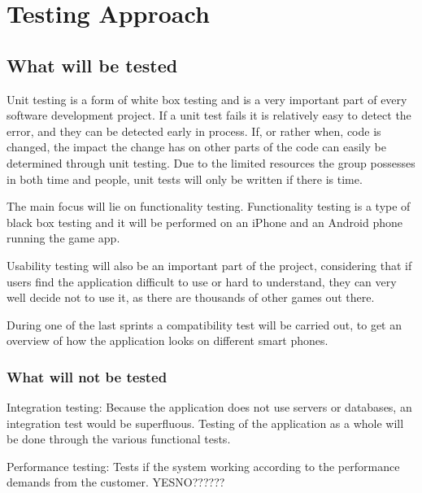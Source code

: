 \section{Testing Approach}

\subsection{What will be tested}

	Unit testing is a form of white box testing and is a very important part of every software development project. If a unit test fails it is relatively easy to detect the error, and they can be detected early in process. If, or rather when, code is changed, the impact the change has on other parts of the code can easily be determined through unit testing. Due to the limited resources
	the group possesses in both time and people, unit tests will only be written if there is time. 

	The main focus will lie on functionality testing. Functionality testing is a type of black box testing and it will be performed on an iPhone and an Android phone running the game app.

	Usability testing will also be an important part of the project, considering that if users find the application difficult to use or hard to understand, they can very well decide not to use it, as there are thousands of other games out there.

	During one of the last sprints a compatibility test will be carried out, to get an overview of how the application looks on different smart phones.

\subsubsection{What will not be tested}

	Integration testing: Because the application does not use servers or databases, an integration test would be superfluous. Testing of the application as a whole will be done through the various functional tests.

	Performance testing: Tests if the system working according to the performance demands from the customer. YESNO??????